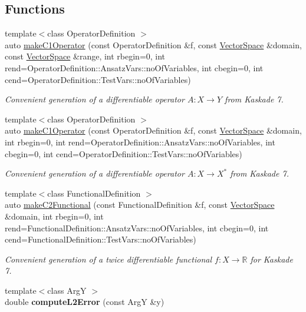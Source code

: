 \subsection*{Functions}
\begin{DoxyCompactItemize}
\item 
{\footnotesize template$<$class Operator\+Definition $>$ }\\auto \hyperlink{group__KaskadeGroup_gae521d64422967ee3679b8e5bc26de996_gae521d64422967ee3679b8e5bc26de996}{make\+C1\+Operator} (const Operator\+Definition \&f, const \hyperlink{classSpacy_1_1VectorSpace}{Vector\+Space} \&domain, const \hyperlink{classSpacy_1_1VectorSpace}{Vector\+Space} \&range, int rbegin=0, int rend=Operator\+Definition\+::\+Ansatz\+Vars\+::no\+Of\+Variables, int cbegin=0, int cend=Operator\+Definition\+::\+Test\+Vars\+::no\+Of\+Variables)
\begin{DoxyCompactList}\small\item\em Convenient generation of a differentiable operator $A: X\rightarrow Y$ from Kaskade 7. \end{DoxyCompactList}\item 
{\footnotesize template$<$class Operator\+Definition $>$ }\\auto \hyperlink{group__KaskadeGroup_ga8af78a452fabadde5f03fc4dc56face8_ga8af78a452fabadde5f03fc4dc56face8}{make\+C1\+Operator} (const Operator\+Definition \&f, const \hyperlink{classSpacy_1_1VectorSpace}{Vector\+Space} \&domain, int rbegin=0, int rend=Operator\+Definition\+::\+Ansatz\+Vars\+::no\+Of\+Variables, int cbegin=0, int cend=Operator\+Definition\+::\+Test\+Vars\+::no\+Of\+Variables)
\begin{DoxyCompactList}\small\item\em Convenient generation of a differentiable operator $A: X\rightarrow X^*$ from Kaskade 7. \end{DoxyCompactList}\item 
{\footnotesize template$<$class Functional\+Definition $>$ }\\auto \hyperlink{group__KaskadeGroup_gacef43eab636b05ddcfb7768041a2bc0e_gacef43eab636b05ddcfb7768041a2bc0e}{make\+C2\+Functional} (const Functional\+Definition \&f, const \hyperlink{classSpacy_1_1VectorSpace}{Vector\+Space} \&domain, int rbegin=0, int rend=Functional\+Definition\+::\+Ansatz\+Vars\+::no\+Of\+Variables, int cbegin=0, int cend=Functional\+Definition\+::\+Test\+Vars\+::no\+Of\+Variables)
\begin{DoxyCompactList}\small\item\em Convenient generation of a twice differentiable functional $f: X\rightarrow \mathbb{R}$ for Kaskade 7. \end{DoxyCompactList}\item 
\hypertarget{namespaceSpacy_1_1Kaskade_ab6cfab73b38ebb470fe9ea97bca2ee62}{}{\footnotesize template$<$class Arg\+Y $>$ }\\double {\bfseries compute\+L2\+Error} (const Arg\+Y \&y)\label{namespaceSpacy_1_1Kaskade_ab6cfab73b38ebb470fe9ea97bca2ee62}


\end{DoxyCompactItemize}
